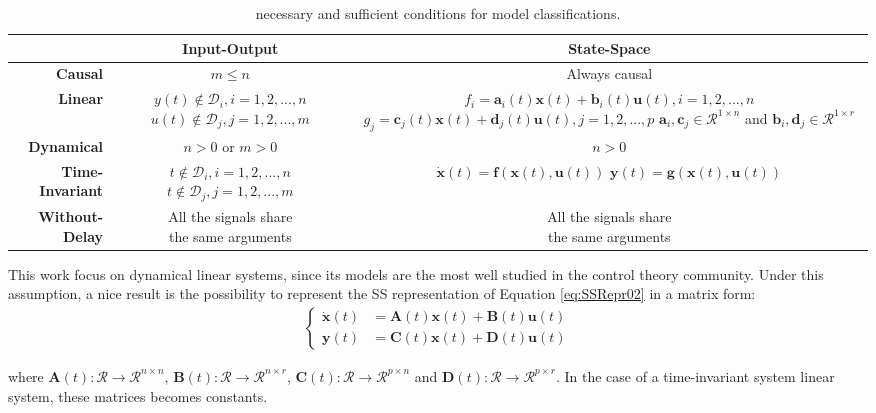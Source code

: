\documentclass[a4paper,11pt]{book}
\numberwithin{figure}{chapter}
\numberwithin{equation}{chapter}
\numberwithin{table}{chapter}
\theoremstyle{definition}
\begin{document}
\begin{table}[hp]
	\centering
	\begin{tabular}{r | c | c }
	 & \textbf{Input-Output} & \textbf{State-Space} \\
	\hline 
		\textbf{Causal}			& $m \leq n$ & Always causal \\
	\hline 
		\textbf{Linear}			& \makecell{$y(t) \notin \mathcal{D}_i, i=1,2,...,n$\\$u(t) \notin \mathcal{D}_j, j=1,2,...,m$} & \makecell{$f_i = \bm{a}_i(t) \bm{x}(t) + \bm{b}_i(t) \bm{u}(t), i = 1,2,...,n$ \\ $g_j = \bm{c}_j(t) \bm{x}(t) + \bm{d}_j(t) \bm{u}(t), j = 1,2,...,p$ \\ $\bm{a}_i,\bm{c}_j \in \mathcal{R}^{1 \times n}$ and $\bm{b}_i, \bm{d}_j \in \mathcal{R}^{1 \times r}$} \\
	\hline 
		\textbf{Dynamical}		& $n > 0$ or $m > 0$ & $n > 0$ \\
	\hline 
		\textbf{Time-Invariant}	& \makecell{$t \notin \mathcal{D}_i, i=1,2,...,n$\\$t \notin \mathcal{D}_j, j=1,2,...,m$} & \makecell{$\dot{\bm{x}}(t) = \bm{f}(\bm{x}(t), \bm{u}(t))$ \\ $\bm{y}(t) = \bm{g}(\bm{x}(t), \bm{u}(t))$} \\
	\hline 
		\textbf{Without-Delay}	& \makecell{All the signals share\\the same arguments} & \makecell{All the signals share\\the same arguments} \\
	\end{tabular} 
	\caption{necessary and sufficient conditions for model classifications.}
	\label{table:classes01}	
\end{table} 

This work focus on dynamical linear systems, since its models are the most well studied in the control theory community. Under this assumption, a nice result is the possibility to represent the SS representation of Equation \eqref{eq:SSRepr02} in a matrix form:
\begin{align} \label{eq:SSRepr03}
\begin{cases}
	\dot{\bm{x}}(t) &= \bm{A}(t) \bm{x}(t) + \bm{B}(t) \bm{u}(t) \\
	\bm{y}(t) &= \bm{C}(t) \bm{x}(t) + \bm{D}(t) \bm{u}(t)
\end{cases}
\end{align}

\noindent where $\bm{A}(t) : \mathcal{R} \rightarrow \mathcal{R}^{n \times n}$, $\bm{B}(t) : \mathcal{R} \rightarrow \mathcal{R}^{n \times r}$, $\bm{C}(t) : \mathcal{R} \rightarrow \mathcal{R}^{p \times n}$ and $\bm{D}(t) : \mathcal{R} \rightarrow \mathcal{R}^{p \times r}$. In the case of a time-invariant system linear system, these matrices becomes constants. 
\end{document}

